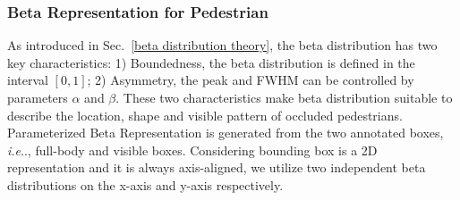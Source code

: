 \documentclass{article}
\makeatletter
\DeclareRobustCommand\onedot{\futurelet\@let@token\@onedot}
\def\@onedot{\ifx\@let@token.\else.\null\fi\xspace}
\def\ie{\emph{i.e}\onedot} \def\Ie{\emph{I.e}\onedot}
\makeatother
\begin{document}
\subsubsection{Beta Representation for Pedestrian}
As introduced in Sec.~\ref{beta distribution theory}, the beta distribution has two key characteristics: 1) Boundedness, the beta distribution is defined in the interval $[0, 1]$; 2) Asymmetry, the peak and FWHM can be controlled by parameters $\alpha$ and $\beta$. 
These two characteristics make beta distribution suitable to describe the location, shape and visible pattern of occluded pedestrians.
Parameterized Beta Representation is generated from the two annotated boxes, \ie, full-body and visible boxes.
Considering bounding box is a 2D representation and it is always axis-aligned, we utilize two independent beta distributions on the x-axis and y-axis respectively. 
\end{document}
